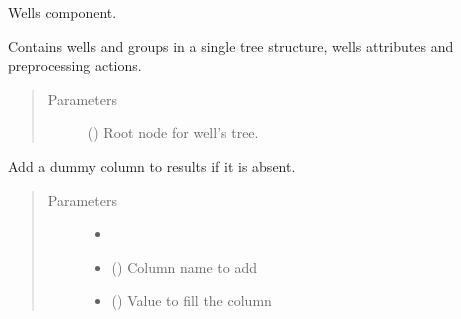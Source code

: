 \documentclass[letterpaper,10pt,english]{sphinxmanual}
\begin{document}
\begin{fulllineitems}
\label{\detokenize{api/wells:geology.src.wells.Wells}}
Wells component.

Contains wells and groups in a single tree structure, wells attributes
and preprocessing actions.
\begin{quote}\begin{description}
\item[{Parameters}] \leavevmode
{} ({\hyperref[\detokenize{api/wells:geology.src.wells.WellSegment}]{}}\sphinxstyleliteralemphasis{\sphinxupquote{, }}) \textendash{} Root node for well’s tree.

\end{description}\end{quote}

\begin{fulllineitems}
\label{\detokenize{api/wells:geology.src.wells.Wells.add_null_results_column}}
Add a dummy column to results if it is absent.
\begin{quote}\begin{description}
\item[{Parameters}] \leavevmode\begin{itemize}
\item {} 
 \textendash{} 

\item {} 
 () \textendash{} Column name to add

\item {} 
 () \textendash{} Value to fill the column

\end{itemize}


\end{description}
\end{quote}
\end{fulllineitems}
\end{fulllineitems}
\end{document}
